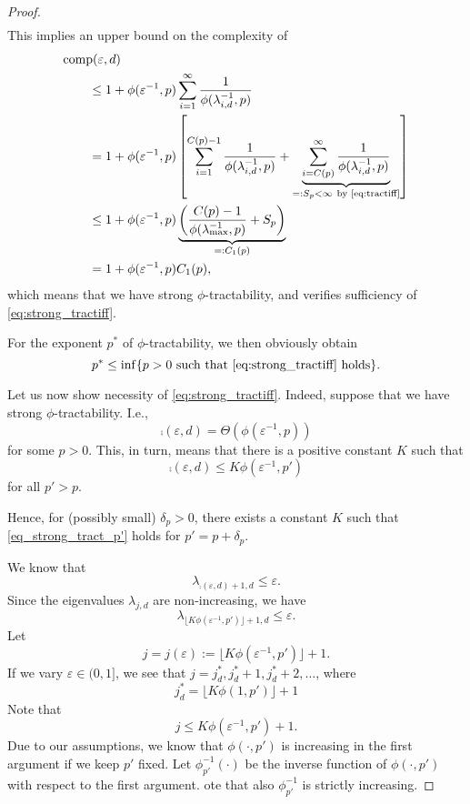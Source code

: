 \documentclass[11pt,a4paper]{article}
\begin{document}
\begin{proof}
\begin{align*}
\end{align*}
This implies an upper bound on the complexity of
\begin{align*}
       \MoveEqLeft{\comp(\varepsilon,d)} \\
       &\le 1 + \phi(\varepsilon^{-1},p) \sum_{i=1}^\infty \frac{1}{\phi(\lambda_{i, d}^{-1},p)} \\
       & = 1 + \phi(\varepsilon^{-1}, p) \left [ \sum_{i=1}^{C(p)-1} \frac{1}{\phi(\lambda_{i, d}^{-1},p)}  
       + \underbrace{\sum_{i=C(p)}^\infty \frac{1}{\phi(\lambda_{i, d}^{-1},p)}}_{=:S_p <\infty\ \text{by \eqref{eq:tractiff}} }\right] \\
       & \le 1+ \phi(\varepsilon^{-1},p) \underbrace{\left(\frac{C(p)-1}{\phi(\lambda_{\max}^{-1},p)} + S_p\right)}_{=:C_1(p)}\\
       & = 1+ \phi(\varepsilon^{-1},p) C_1 (p),
\end{align*}
which means that we have strong $\phi$-tractability, and verifies sufficiency of \eqref{eq:strong_tractiff}. 

\bigskip

For the exponent $p^*$ of $\phi$-tractability, we then obviously obtain 
\[
 p^* \le \inf\{p>0\ \mbox{such that \eqref{eq:strong_tractiff} holds}\}.
\]


\bigskip


Let us now show necessity of \eqref{eq:strong_tractiff}. Indeed, suppose that we have strong 
$\phi$-tractability. I.e., 
\[
\comp(\varepsilon,d)=\Theta (\phi(\varepsilon^{-1},p))
\]
for some $p>0$. This, in turn, means that there is a positive constant $K$ such that
\begin{equation}\label{eq_strong_tract_p'}
\comp(\varepsilon,d)\le K \phi(\varepsilon^{-1},p')
\end{equation}
for all $p'>p$. 

Hence, for (possibly small) $\delta_p>0$, there exists a constant $K$ such that \eqref{eq_strong_tract_p'} holds for $p'=p+\delta_p$.

We know that
\[
\lambda_{\comp(\varepsilon,d)+1,d}\le \varepsilon.
\]
Since the eigenvalues $\lambda_{j,d}$ are non-increasing, we have
\begin{equation}\label{eq:lambda_K_strong}
\lambda_{\lfloor K \phi(\varepsilon^{-1},p')\rfloor +1,d}\le \varepsilon.
\end{equation}
Let
\[
j=j (\varepsilon):= \lfloor K \phi(\varepsilon^{-1},p')\rfloor +1.
\]
If we vary $\varepsilon\in (0,1]$, we see that $j=j_d^*, j_d^*+1, j_d^*+2,\ldots$, where 
\[
  j_d^*=\lfloor K \phi(1,p')\rfloor +1
\]
Note that
\[
j\le K \phi(\varepsilon^{-1},p')+1.
\]
Due to our assumptions, we know that 
$\phi(\cdot, p')$ is increasing in the first argument if 
we keep $p'$ fixed. Let $\phi_{p'}^{-1} (\cdot)$ be the inverse function of $\phi (\cdot, p')$ with respect to the first argument. 
ote that also $\phi_{p'}^{-1}$ is strictly increasing. 


\end{proof}
\end{document}
